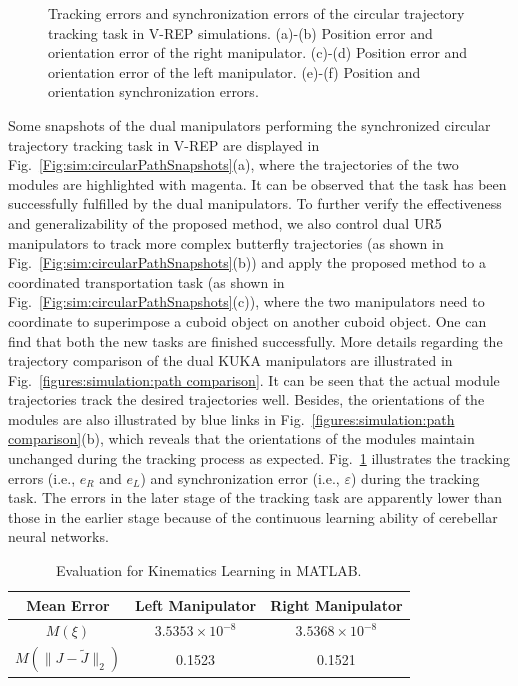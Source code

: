 \documentclass[journal,twoside,web]{ieeecolor}
\begin{document}
\begin{figure}[!t]
{        \label{figures:simulation:circle tracking results:f}
    }
    \caption{Tracking errors and synchronization errors of the circular trajectory tracking task in V-REP simulations. (a)-(b) Position error and orientation error of the right manipulator. (c)-(d) Position error and orientation error of the left manipulator. (e)-(f) Position and orientation synchronization errors.
    }
    \label{figures:simulation:circle tracking results}
\end{figure}

Some snapshots of the dual manipulators performing the synchronized circular trajectory tracking task in V-REP are displayed in Fig.~\ref{Fig:sim:circularPathSnapshots}(a), where the trajectories of the two modules are highlighted with magenta. It can be observed that the task has been successfully fulfilled by the dual manipulators. To further verify the effectiveness and generalizability of the proposed method, we also control dual UR5 manipulators to track more complex butterfly trajectories (as shown in Fig.~\ref{Fig:sim:circularPathSnapshots}(b)) and apply the proposed method to a coordinated transportation task (as shown in Fig.~\ref{Fig:sim:circularPathSnapshots}(c)), where the two manipulators need to coordinate to superimpose a cuboid object on another cuboid object. One can find that both the new tasks are finished successfully. More details regarding the trajectory comparison of the dual KUKA manipulators are illustrated in Fig.~\ref{figures:simulation:path comparison}. It can be seen that the actual module trajectories track the desired trajectories well. Besides, the orientations of the modules are also illustrated by blue links in Fig.~\ref{figures:simulation:path comparison}(b), which reveals that the orientations of the modules maintain unchanged during the tracking process as expected. Fig.~\ref{figures:simulation:circle tracking results} illustrates the tracking errors (i.e., $e_{R}$ and $e_{L}$) and synchronization error (i.e., $\varepsilon$) during the tracking task. The errors in the later stage of the tracking task are apparently lower than those in the earlier stage because of the continuous learning ability of cerebellar neural networks.


\begin{table}[tbp]
\centering
\caption{Evaluation for Kinematics Learning in MATLAB.}
\begin{tabular}{ccc}
\toprule
Mean Error                & Left Manipulator & Right Manipulator \\ \midrule
$M(\xi)$                     & $3.5353\times 10^{-8}$                & $3.5368\times 10^{-8}$               \\
$M(\|J-\tilde{J}\|_2)$ & 0.1523                & 0.1521                 \\ \bottomrule
\end{tabular}
\label{table:simulation:Jacobian}
\end{table}
\end{document}
